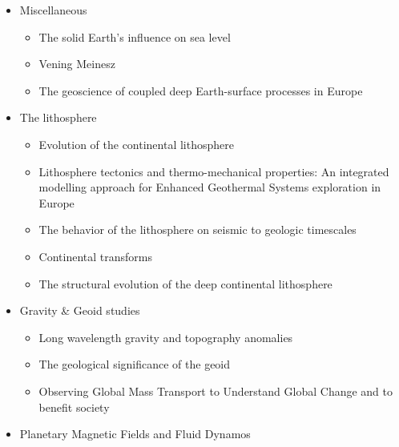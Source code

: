 \begin{itemize}
\item Miscellaneous
   \begin{itemize}
   \item The solid Earth's influence on sea level \cite{conr13}  
   \item Vening Meinesz \cite{vlaa89}
   \item The geoscience of coupled deep Earth-surface processes in Europe \cite{clzb07}
   \end{itemize}

\item The lithosphere
   \begin{itemize}
   \item [\twothousandfive] Evolution of the continental lithosphere \cite{slee05}
   \item [\twothousandten] Lithosphere tectonics and thermo-mechanical properties: An integrated modelling
         approach for Enhanced Geothermal Systems exploration in Europe \cite{clvz10}
   \item [\twothousandthirteen] The behavior of the lithosphere on seismic to geologic timescales \cite{wazh13}
   \item [\twothousandfourteen] Continental transforms \cite{noto14}
   \item [\twothousandseventeen] The structural evolution of the deep continental lithosphere \cite{comm17}
   \end{itemize}

\item Gravity \& Geoid studies
   \begin{itemize}
   \item Long wavelength gravity and topography anomalies \cite{wada81}
   \item The geological significance of the geoid \cite{chas85}
   \item Observing Global Mass Transport to Understand Global Change and to benefit society \cite{pabb15}
   \end{itemize}

\item Planetary Magnetic Fields and Fluid Dynamos \cite{jone11}



\end{itemize}
